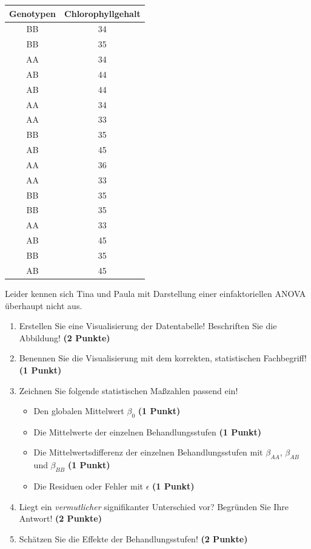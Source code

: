 \documentclass[a4paper, 9pt]{scrartcl}\usepackage[]{graphicx}\usepackage[]{xcolor}
\newenvironment{knitrout}{}{} %
\begin{document}
\begin{knitrout}
\color{fgcolor}\begin{table}[!h]
\centering
\begin{tabular}{cc}
\toprule
Genotypen & Chlorophyllgehalt\\
\midrule
BB & 34\\
BB & 35\\
AA & 34\\
AB & 44\\
AB & 44\\
\addlinespace
AA & 34\\
AA & 33\\
BB & 35\\
AB & 45\\
AA & 36\\
\addlinespace
AA & 33\\
BB & 35\\
BB & 35\\
AA & 33\\
AB & 45\\
\addlinespace
BB & 35\\
AB & 45\\
\bottomrule
\end{tabular}
\end{table}

\end{knitrout}

Leider kennen sich Tina und Paula mit Darstellung einer einfaktoriellen ANOVA überhaupt nicht aus. 

\begin{enumerate}
\item Erstellen  Sie  eine  Visualisierung  der  Datentabelle! Beschriften  Sie  die  Abbildung! \textbf{(2 Punkte)}
\item Benennen Sie die Visualisierung mit dem korrekten, statistischen Fachbegriff! \textbf{(1 Punkt)}
\item Zeichnen Sie folgende statistischen Maßzahlen passend ein! 
  \begin{itemize}
  \item Den globalen Mittelwert $\beta_0$ \textbf{(1 Punkt)}
  \item Die Mittelwerte der einzelnen Behandlungsstufen \textbf{(1 Punkt)}
  \item Die Mittelwertsdifferenz der einzelnen Behandlungsstufen mit $\beta_{AA}$, $\beta_{AB}$ und $\beta_{BB}$ \textbf{(1 Punkt)}
  \item Die Residuen oder Fehler mit $\epsilon$ \textbf{(1 Punkt)}
  \end{itemize}
\item Liegt ein \textit{vermutlicher} signifikanter Unterschied vor? Begründen Sie Ihre Antwort! \textbf{(2 Punkte)}
\item Schätzen Sie die Effekte der Behandlungsstufen! \textbf{(2 Punkte)}
\end{enumerate}
 
\end{document}
